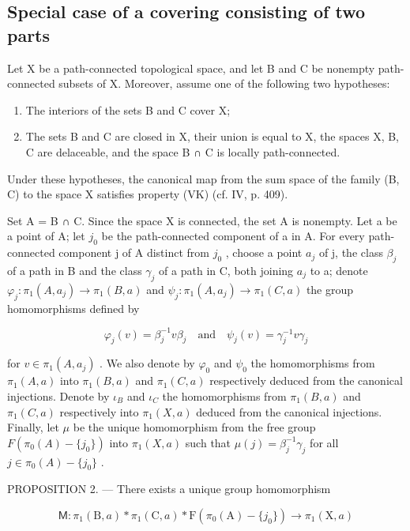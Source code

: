 \subsection{Special case of a covering consisting of two parts}

Let X be a path-connected topological space, and let B and C be nonempty path-connected subsets of X. Moreover, assume one of the following two hypotheses:

\begin{enumerate}
\def\labelenumi{(\roman{enumi})}
\item
  The interiors of the sets B and C cover X;
\item
  The sets B and C are closed in X, their union is equal to X, the spaces X, B, C are delaceable, and the space B ∩ C is locally path-connected.
\end{enumerate}

Under these hypotheses, the canonical map from the sum space of the family (B, C) to the space X satisfies property (VK) (cf. IV, p. 409).

Set A = B ∩ C. Since the space X is connected, the set A is nonempty. Let a be a point of A; let \(j_{0}\) be the path-connected component of a in A. For every path-connected component j of A distinct from \(j_{0}\) , choose a point \(a_{j}\) of j, the class \(\beta_{j}\) of a path in B and the class \(\gamma_{j}\) of a path in C, both joining \(a_{j}\) to a; denote \(\varphi_{j}\colon\pi_{1}(A,a_{j})\to\pi_{1}(B,a)\) and \(\psi_{j}\colon\pi_{1}(A,a_{j})\to\pi_{1}(C,a)\) the group homomorphisms defined by

\[
\varphi_ {j} (v) = \beta_ {j} ^ {- 1} v \beta_ {j} \quad \text {and} \quad \psi_ {j} (v) = \gamma_ {j} ^ {- 1} v \gamma_ {j}
\]

for \(v \in \pi_1(A, a_j)\) . We also denote by \(\varphi_0\) and \(\psi_0\) the homomorphisms from \(\pi_1(A, a)\) into \(\pi_1(B, a)\) and \(\pi_1(C, a)\) respectively deduced from the canonical injections. Denote by \(\iota_B\) and \(\iota_C\) the homomorphisms from \(\pi_1(B, a)\) and \(\pi_1(C, a)\) respectively into \(\pi_1(X, a)\) deduced from the canonical injections. Finally, let \(\mu\) be the unique homomorphism from the free group \(F(\pi_0(A) - \{j_0\})\) into \(\pi_1(X, a)\) such that \(\mu(j) = \beta_j^{-1}\gamma_j\) for all \(j \in \pi_0(A) - \{j_0\}\) .

PROPOSITION 2. --- There exists a unique group homomorphism

\[
\mathsf {M} \colon \pi_ {1} (\mathrm{B}, a) * \pi_ {1} (\mathrm{C}, a) * \mathrm{F} (\pi_ {0} (\mathrm{A}) - \{j _ {0} \}) \to \pi_ {1} (\mathrm{X}, a)
\]

